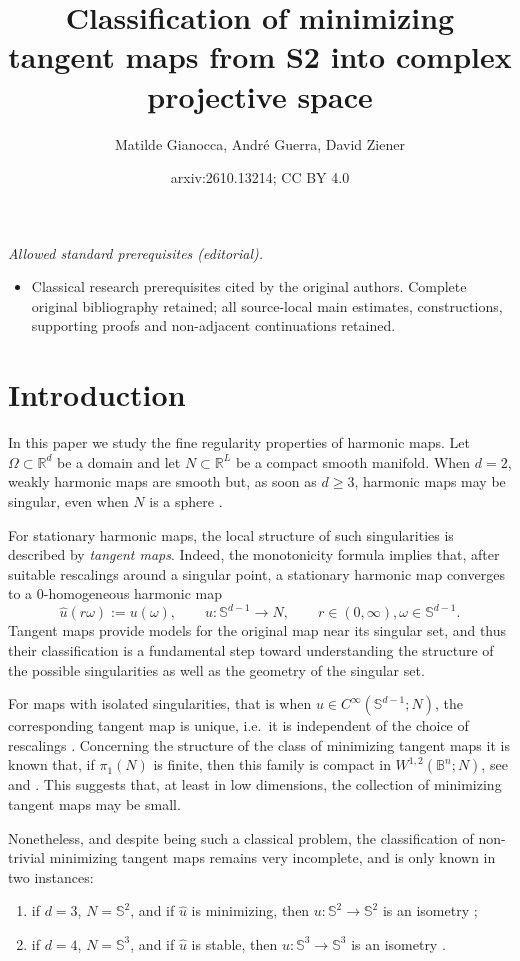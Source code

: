 \documentclass[11pt]{article}
\title{Classification of minimizing tangent maps from S2 into complex projective space}
\author{Matilde Gianocca, André Guerra, David Ziener}
\date{arxiv:2610.13214; CC BY 4.0}
\theoremstyle{plain}
\numberwithin{equation}{section}
\theoremstyle{definition}
\def \mb{\mathbb}
\begin{document}
\maketitle
\noindent\textit{Allowed standard prerequisites (editorial).}\begin{itemize}
\item Classical research prerequisites cited by the original authors. Complete original bibliography retained; all source-local main estimates, constructions, supporting proofs and non-adjacent continuations retained.
\end{itemize}\medskip
\section{Introduction}
In this paper we study the fine regularity properties of harmonic maps. Let $\Omega\subset \mathbb{R}^d$ be a domain and let $N\subset \mathbb{R}^L$ be a compact smooth manifold. When $d=2$, weakly harmonic maps are smooth \cite{Helein2002} but, as soon as $d\geq 3$, harmonic maps may be singular, even when $N$ is a sphere \cite{Lin2008}. 

For  stationary harmonic maps, the local structure of such singularities is described by \textit{tangent maps}. Indeed, the monotonicity formula implies that, after suitable rescalings around a singular point, a stationary harmonic map converges to a 0-homogeneous harmonic map
$$\hat u(r \omega):= u(\omega), \qquad   u\colon \mb S^{d-1}\to N, \qquad r\in (0,\infty), \omega\in \mb S^{d-1}.$$
Tangent maps provide models for the original map near its singular set, and thus their classification is a fundamental step toward understanding the structure of the possible singularities as well as the geometry of the singular set.

For maps with isolated singularities, that is when $u\in C^\infty(\mb S^{d-1};N)$, the corresponding tangent map is unique, i.e.\ it is independent of the choice of rescalings \cite{Simon1983}. Concerning the structure of the class of minimizing tangent maps  it is known that, if $\pi_1(N)$ is finite, then this family is compact in $W^{1,2}(\mb B^n;N)$, see \cite[Theorem 5.7]{Mazowiecka2018} and \cite[Theorem 6.4]{Hardt1987a}. This suggests that, at least in low dimensions, the collection of minimizing tangent maps may be small.

Nonetheless,  and despite being such a classical problem, the classification of non-trivial minimizing tangent maps remains very incomplete, and is only known in two instances:
\begin{enumerate}
\item\label{it:BCL} if $d=3$, $N=\mb S^2$, and if $\hat u$ is minimizing,  then $u\colon \mb S^2\to \mb S^2$ is an isometry \cite{Brezis1986};
\item \label{it:Naka} if $d=4$, $N=\mb S^3$, and if $\hat u$ is stable, then $u\colon \mb S^3\to \mb S^3$ is an isometry \cite{Nakajima2006}. 
\end{enumerate}
\end{document}
